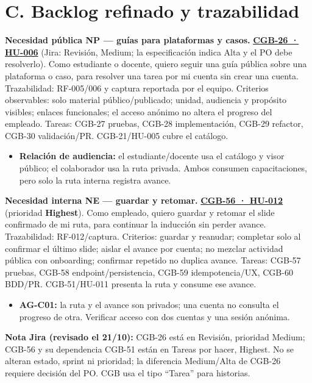 \documentclass[10pt,a4paper]{extarticle}
\begin{document}
\newpage
\section*{C. Backlog refinado y trazabilidad}
\textbf{Necesidad pública NP — guías para plataformas y casos.} \textbf{\href{https://cgb-academy.atlassian.net/browse/CGB-26}{CGB-26 · HU-006}} (Jira: Revisión, Medium; la especificación indica Alta y el PO debe resolverlo). Como estudiante o docente, quiero seguir una guía pública sobre una plataforma o caso, para resolver una tarea por mi cuenta sin crear una cuenta. Trazabilidad: RF-005/006 y captura reportada por el equipo. Criterios observables: solo material público/publicado; unidad, audiencia y propósito visibles; enlaces funcionales; el acceso anónimo no altera el progreso del empleado. Tareas: CGB-27 pruebas, CGB-28 implementación, CGB-29 refactor, CGB-30 validación/PR. CGB-21/HU-005 cubre el catálogo.
\begin{itemize}
\item \textbf{Relación de audiencia:} el estudiante/docente usa el catálogo y visor público; el colaborador usa la ruta privada. Ambos consumen capacitaciones, pero solo la ruta interna registra avance.
\end{itemize}

\textbf{Necesidad interna NE — guardar y retomar.} \textbf{\href{https://cgb-academy.atlassian.net/browse/CGB-56}{CGB-56 · HU-012}} (prioridad \textbf{Highest}). Como empleado, quiero guardar y retomar el slide confirmado de mi ruta, para continuar la inducción sin perder avance. Trazabilidad: RF-012/captura. Criterios: guardar y reanudar; completar solo al confirmar el último slide; aislar el avance por cuenta; no mezclar actividad pública con onboarding; confirmar repetido no duplica avance. Tareas: CGB-57 pruebas, CGB-58 endpoint/persistencia, CGB-59 idempotencia/UX, CGB-60 BDD/PR. CGB-51/HU-011 presenta la ruta y consume ese avance.
\begin{itemize}
\item \textbf{AG-C01:} la ruta y el avance son privados; una cuenta no consulta el progreso de otra. Verificar acceso con dos cuentas y una sesión anónima.
\end{itemize}

\textbf{Nota Jira (revisado el 21/10):} CGB-26 está en Revisión, prioridad Medium; CGB-56 y su dependencia CGB-51 están en Tareas por hacer, Highest. No se alteran estado, sprint ni prioridad; la diferencia Medium/Alta de CGB-26 requiere decisión del PO. CGB usa el tipo ``Tarea'' para historias.
\end{document}
